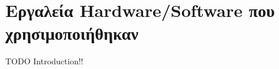 \chapter{Εργαλεία Hardware/Software που χρησιμοποιήθηκαν}
\label{chapter:tools_hw_sw}

TODO Introduction!!




